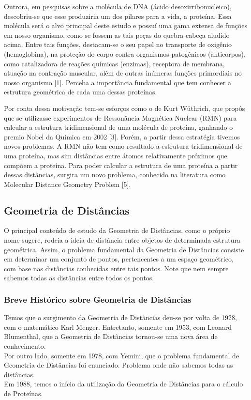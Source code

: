 \documentclass[a4paper,12pt]{article}
\begin{document}
	Outrora, em pesquisas sobre a molécula de DNA (ácido desoxirribonucleico), descobriu-se que esse produziria um dos pilares para a vida, a proteína. Essa molécula será o alvo principal deste estudo e possuí uma gama extensa de funções em nosso organismo, como se fossem as tais peças do quebra-cabeça aludido acima. Entre tais funções, destacam-se o seu papel no transporte de oxigênio (hemoglobina), na proteção do corpo contra organismos patogênicos (anticorpos), como catalizadora de reações químicas (enzimas), receptora de membrana, atuação na contração muscular, além de outras inúmeras funções primordiais no nosso organismo [1]. Perceba a importância fundamental que tem conhecer a estrutura geométrica de cada uma dessas proteínas.
	
	Por conta dessa motivação tem-se esforços como o de Kurt Wüthrich, que propôs que se utilizasse experimentos de Ressonância Magnética Nuclear
	(RMN) para calcular a estrutura tridimensional de uma molécula de proteína, ganhando o premio Nobel da Química em 2002 [3]. Porém, a partir dessa estratégia tivemos novos problemas. A RMN não tem como resultado a estrutura tridimensional de uma proteína, mas sim distâncias entre átomos relativamente próximos que compõem a proteína. Para poder calcular a estrutura de uma proteína a partir dessas distâncias, surgira um novo problema, conhecido na literatura como Molecular Distance Geometry Problem [5].
	
	\subsection{Geometria de Distâncias}
	O principal conteúdo de estudo da Geometria de Distâncias, como o próprio nome sugere, rodeia a ideia de distância entre objetos de determinada estrutura geométrica. Assim, o problema fundamental da Geometria de Distâncias consiste em determinar um conjunto de pontos, pertencentes a um espaço geométrico, com base nas distâncias conhecidas entre tais pontos. Note que nem sempre sabemos todas as distâncias entre todos os pontos.
	\subsubsection*{Breve Histórico sobre Geometria de Distâncias}
	Temos que o surgimento da Geometria de Distâncias deu-se por volta de 1928, com o matemático Karl Menger. Entretanto, somente em 1953, com Leonard Blumenthal, que a Geometria de Distâncias tornou-se uma nova área de conhecimento.
	\\
	Por outro lado, somente em 1978, com Yemini, que o problema fundamental de Geometria de Distâncias foi enunciado. Problema onde não sabemos todas as distâncias.
	\\
	Em 1988, temos o início da utilização da Geometria de Distâncias para o cálculo de Proteínas.
	
\end{document}
